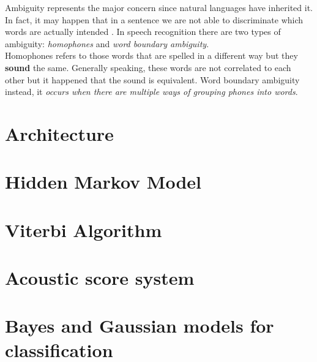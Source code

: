 \noindent Ambiguity represents the major concern since natural languages have inherited it. In fact, it may happen that in a sentence we are not able to discriminate which words are actually intended \cite{forsberg2003speech}. In speech recognition there are two types of ambiguity: \textit{homophones} and \textit{word boundary ambiguity}. \\
Homophones refers to those words that are spelled in a different way but they \textbf{sound} the same. Generally speaking, these words are not correlated to each other but it happened that the sound is equivalent. Word boundary ambiguity instead, it \textit{occurs when there are multiple ways of grouping phones into words}\cite{forsberg2003speech}.

\section{Architecture}
\label{sec:speech_rec_Architecture}

\section{Hidden Markov Model}
\label{sec:hmm}

\section{Viterbi Algorithm}
\label{sec:viterbi}

\section{Acoustic score system}
\label{sec:acoustic_score_system}

\section{\Naive Bayes and Gaussian models for classification}
\label{sec:Gaussian Classifiers and Distance Measures}
